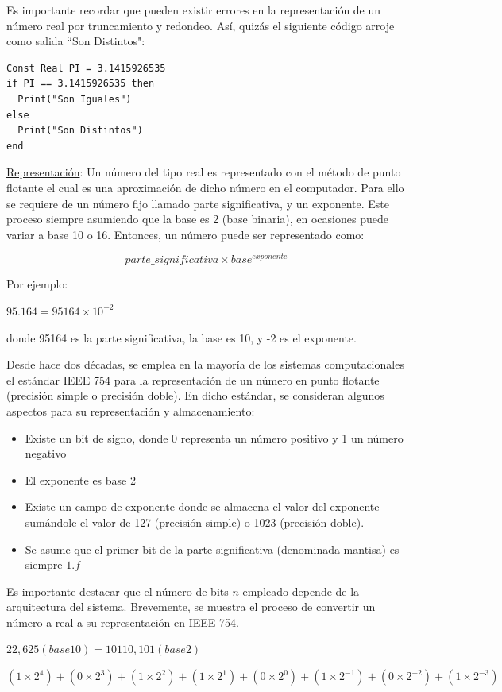 Es importante recordar que pueden existir errores en la representación de un número real por truncamiento y redondeo. Así, quizás el siguiente código arroje como salida ``Son Distintos":
\begin{lstlisting}[upquote=true, language=pseudo]
Const Real PI = 3.1415926535
if PI == 3.1415926535 then
  Print("Son Iguales")
else
  Print("Son Distintos")
end
\end{lstlisting}

\underline{Representación}: Un número del tipo real es representado con el método de punto flotante el cual es una aproximación de dicho número en el computador. Para ello se requiere de un número fijo llamado parte significativa, y un exponente. Este proceso siempre asumiendo que la base es 2 (base binaria), en ocasiones puede variar a base 10 o 16. Entonces, un número puede ser representado como:

$$parte\_significativa \times base^{exponente}$$

Por ejemplo:

$95.164 = 95164 \times 10^{-2}$

\noindent donde 95164 es la parte significativa, la base es 10, y -2 es el exponente.

Desde hace dos décadas, se emplea en la mayoría de los sistemas computacionales el estándar IEEE 754 para la representación de un número en punto flotante (precisión simple o precisión doble). En dicho estándar, se consideran algunos aspectos para su representación y almacenamiento:
\begin{itemize}
\item Existe un bit de signo, donde 0 representa un número positivo y 1 un número negativo
\item El exponente es base 2
\item Existe un campo de exponente donde se almacena el valor del exponente sumándole el valor de 127 (precisión simple) o 1023 (precisión doble).
\item Se asume que el primer bit de la parte significativa (denominada mantisa) es siempre $1.f$
\end{itemize}

Es importante destacar que el número de bits $n$ empleado depende de la arquitectura del sistema. Brevemente, se muestra el proceso de convertir un número a real a su representación en IEEE 754.

$22,625 (base 10) = 10110,101 (base 2)$

\begin{center}
$(1 \times 2^4) + (0 \times 2^3) + (1 \times 2^2) + (1 \times 2^1) + (0 \times 2^0) + (1 \times 2^{-1}) + (0 \times 2^{-2}) + (1 \times 2^{-3})$
\end{center}

